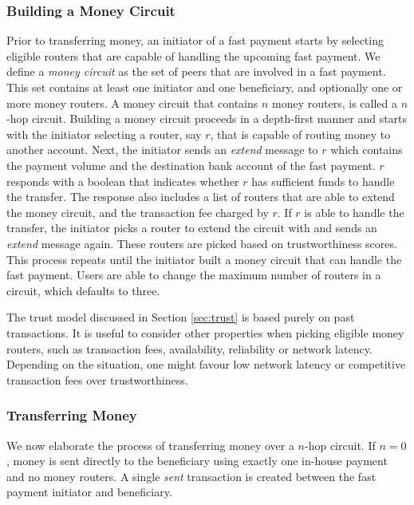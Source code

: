 \subsubsection*{Building a Money Circuit}
Prior to transferring money, an initiator of a fast payment starts by selecting eligible routers that are capable of handling the upcoming fast payment.
We define a \emph{money circuit} as the set of peers that are involved in a fast payment.
This set contains at least one initiator and one beneficiary, and optionally one or more money routers.
A money circuit that contains $ n $ money routers, is called a $n$-hop circuit.
Building a money circuit proceeds in a depth-first manner and starts with the initiator selecting a router, say $ r $, that is capable of routing money to another account.
Next, the initiator sends an \emph{extend} message to $ r $ which contains the payment volume and the destination bank account of the fast payment.
$ r $ responds with a boolean that indicates whether $ r $ has sufficient funds to handle the transfer.
The response also includes a list of routers that are able to extend the money circuit, and the transaction fee charged by $ r $.
If $ r $ is able to handle the transfer, the initiator picks a router to extend the circuit with and sends an \emph{extend} message again.
These routers are picked based on trustworthiness scores.
This process repeats until the initiator built a money circuit that can handle the fast payment. %
Users are able to change the maximum number of routers in a circuit, which defaults to three.

The trust model discussed in Section \ref{sec:trust} is based purely on past transactions.
It is useful to consider other properties when picking eligible money routers, such as transaction fees, availability, reliability or network latency. 
Depending on the situation, one might favour low network latency or competitive transaction fees over trustworthiness.


\subsubsection*{Transferring Money}
We now elaborate the process of transferring money over a $ n $-hop circuit.
If $ n = 0 $, money is sent directly to the beneficiary using exactly one in-house payment and no money routers.
A single \emph{sent} transaction is created between the fast payment initiator and beneficiary.

